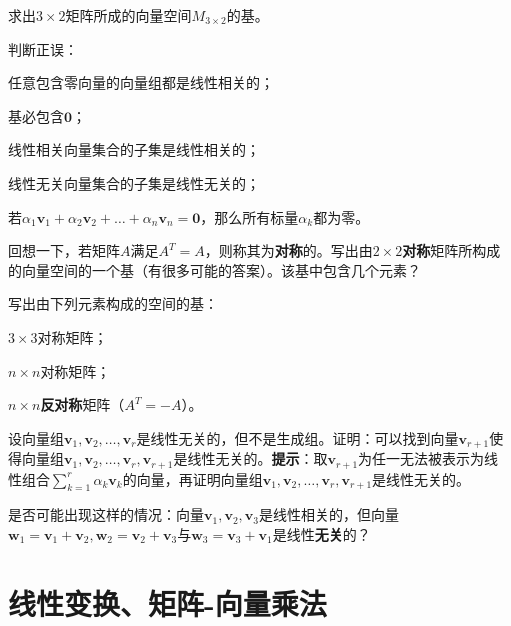 \begin{problemset}
    \item 求出$3\times 2$矩阵所成的向量空间$M_{3\times 2}$的基。
    \item 判断正误：
    \begin{probenumerate}
        \item 任意包含零向量的向量组都是线性相关的；
        \item 基必包含$\mathbf{0}$；
        \item 线性相关向量集合的子集是线性相关的；
        \item 线性无关向量集合的子集是线性无关的；
        \item 若$\alpha_{1}\mathbf{v}_{1}+\alpha_{2}\mathbf{v}_{2}+\ldots+\alpha_{n}\mathbf{v}_{n}=\mathbf{0}$，那么所有标量$\alpha_{k}$都为零。
    \end{probenumerate}
    \item 回想一下，若矩阵$A$满足$A^T=A$，则称其为{\bf 对称}的。写出由$2\times 2$\textbf{对称}矩阵所构成的向量空间的一个基（有很多可能的答案）。该基中包含几个元素？
    \item 写出由下列元素构成的空间的基：
    \begin{probenumerate}
        \item $3\times 3$对称矩阵；
        \item $n\times n$对称矩阵；
        \item $n\times n$\textbf{反对称}矩阵（$A^T=-A$）。
    \end{probenumerate}
    \item \label{ex:1_2_5}设向量组$\mathbf{v}_{1},\mathbf{v}_{2},\ldots,\mathbf{v}_{r}$是线性无关的，但不是生成组。证明：可以找到向量$\mathbf{v}_{r+1}$使得向量组$\mathbf{v}_{1},\mathbf{v}_{2},\ldots,\mathbf{v}_{r},\mathbf{v}_{r+1}$是线性无关的。{\bf 提示}：取$\mathbf{v}_{r+1}$为任一无法被表示为线性组合$\sum_{k=1}^r\alpha_k\mathbf{v}_k$的向量，再证明向量组$\mathbf{v}_{1},\mathbf{v}_{2},\ldots,\mathbf{v}_{r},\mathbf{v}_{r+1}$是线性无关的。
    \item 是否可能出现这样的情况：向量$\mathbf{v}_{1},\mathbf{v}_{2},\mathbf{v}_{3}$是线性相关的，但向量$\mathbf{w}_1=\mathbf{v}_1+\mathbf{v}_2,\mathbf{w}_2=\mathbf{v}_2+\mathbf{v}_3$与$\mathbf{w}_3=\mathbf{v}_3+\mathbf{v}_1$是线性{\bf 无关}的？
\end{problemset}

\section{线性变换、矩阵-向量乘法}

